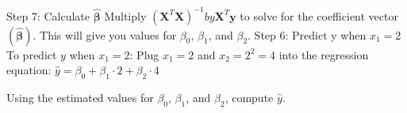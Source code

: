 \documentclass[11pt]{beamer}
\begin{document}
\begin{frame}

Step 7: Calculate $\boldsymbol{\hat{\beta}}$
\bigskip 
\linebreak 
Multiply $(\mathbf{X}^T \mathbf{X})^{-1} by \mathbf{X}^T \mathbf{y}$ 
\medskip 
\linebreak 
to solve for the coefficient vector $(\boldsymbol{\hat{\beta}})$.
\medskip 
\linebreak 
This will give you values for $\beta_0$, $\beta_1$, and $\beta_2$.
\bigskip 
\linebreak 
Step 6: Predict y when $x_1 = 2$
\medskip 
\linebreak 
To predict $y$ when $x_1 = 2$:
\medskip 
\linebreak 
\hspace*{15pt}	Plug $x_1 = 2$ and $x_2 = 2^2 = 4$ into the regression equation:
\medskip 
\linebreak 
\hspace*{15pt}$\hat{y} = \beta_0 + \beta_1 \cdot 2 + \beta_2 \cdot 4$
\medskip 
\linebreak 

Using the estimated values for $\beta_0$, $\beta_1$, and $\beta_2$, compute $\hat{y}$.

\end{frame}
\end{document}

